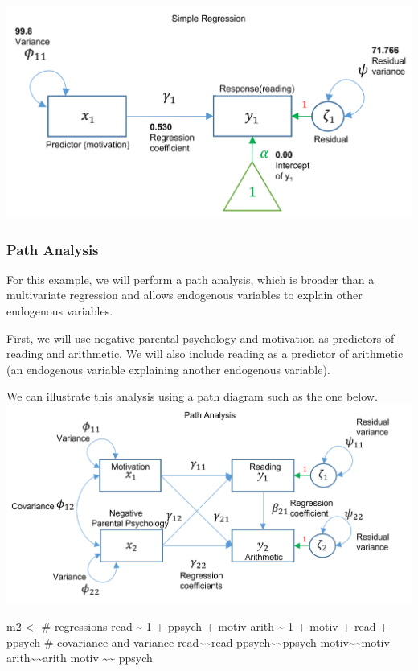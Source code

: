 \documentclass[
]{article}
\newenvironment{Shaded}{\begin{snugshade}}{\end{snugshade}}
\newcommand{\NormalTok}[1]{#1}
\newcommand{\OtherTok}[1]{\textcolor[rgb]{0.56,0.35,0.01}{#1}}
\newcommand{\StringTok}[1]{\textcolor[rgb]{0.31,0.60,0.02}{#1}}
\begin{document}
\includegraphics{SimRegLablCoef.PNG}

\hypertarget{path-analysis}{%
\subsubsection{Path Analysis}\label{path-analysis}}

For this example, we will perform a path analysis, which is broader than
a multivariate regression and allows endogenous variables to explain
other endogenous variables.

First, we will use negative parental psychology and motivation as
predictors of reading and arithmetic. We will also include reading as a
predictor of arithmetic (an endogenous variable explaining another
endogenous variable).

We can illustrate this analysis using a path diagram such as the one
below. \includegraphics{PathAnLabl.PNG}

\begin{Shaded}
\begin{Highlighting}[]
\NormalTok{m2 }\OtherTok{\textless{}{-}} \StringTok{\textquotesingle{}}
\StringTok{  \# regressions}
\StringTok{    read \textasciitilde{} 1 + ppsych + motiv}
\StringTok{    arith \textasciitilde{} 1 + motiv + read + ppsych}
\StringTok{  \# covariance and variance}
\StringTok{    read\textasciitilde{}\textasciitilde{}read}
\StringTok{    ppsych\textasciitilde{}\textasciitilde{}ppsych}
\StringTok{    motiv\textasciitilde{}\textasciitilde{}motiv}
\StringTok{    arith\textasciitilde{}\textasciitilde{}arith}
\StringTok{    motiv \textasciitilde{}\textasciitilde{} ppsych}
\StringTok{    }
\StringTok{\textquotesingle{}}
\end{Highlighting}
\end{Shaded}
\end{document}
